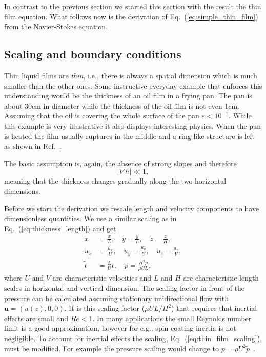 In contrast to the previous section we started this section with the result the thin film equation.
What follows now is the derivation of Eq.~(\ref{eq:simple_thin_film}) from the Navier-Stokes equation.

\subsection{Scaling and boundary conditions}
\label{subsec:thin_film_scaling}
Thin liquid films are \textit{thin}, i.e., there is always a spatial dimension which is much smaller than the other ones. 
Some instructive everyday example that enforces this understanding would be the thickness of an oil film in a frying pan. 
The pan is about 30cm in diameter while the thickness of the oil film is not even 1cm.
Assuming that the oil is covering the whole surface of the pan $\varepsilon < 10^{-1}$.
While this example is very illustrative it also displays interesting physics.
When the pan is heated the film usually ruptures in the middle and a ring-like structure is left as shown in Ref.~\cite{fedorchenkoFormationDrySpots2021}.

The basic assumption is, again, the absence of strong slopes and therefore
\begin{equation}\label{eq:small_slopes}
    |\nabla h| \ll 1,  
\end{equation}
meaning that the thickness changes gradually along the two horizontal dimensions.

Before we start the derivation we rescale length and velocity components to have dimensionless quantities.
We use a similar scaling as in Eq.~(\ref{eq:thickness_length}) and get 
\begin{align}\label{eq:thin_film_scaling}
    \tilde{x} &= \frac{x}{L},\quad \tilde{y} = \frac{y}{L},\quad \tilde{z} = \frac{z}{H},\nonumber \\
    \tilde{u}_x &= \frac{u_x}{U},\quad \tilde{u}_y = \frac{u_y}{U},\quad \tilde{u}_z = \frac{u_z}{V},\nonumber \\
    \tilde{t} &= \frac{L}{U} t,\quad \tilde{p} = \frac{H^2 p}{\mu U L}, 
\end{align}
where $U$ and $V$ are characteristic velocities and $L$ and $H$ are characteristic length scales in horizontal and vertical dimension.
The scaling factor in front of the pressure can be calculated assuming stationary unidirectional flow with $\mathbf{u} = (u(z), 0, 0)$.
It is this scaling factor ($\mu U L /H^2$) that requires that inertial effects are small and $Re<1$.
In many applications the small Reynolds number limit is a good approximation, however for e.g., spin coating inertia is not negligible.
To account for inertial effects the scaling, Eq.~(\ref{eq:thin_film_scaling}), must be modified. 
For example the pressure scaling would change to $p = \rho U^2\tilde{p}$~\cite{crasterDynamicsStabilityThin2009}.

